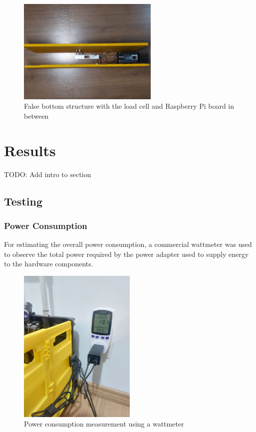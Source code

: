\documentclass[openright]{normas-utf-tex} %
\begin{document}
\begin{figure}[H]
	\centering
	\includegraphics[width=0.6\textwidth]{./images/cartbase2.jpeg}
	\caption[False bottom structure with the load cell and Raspberry Pi board in between]{False bottom structure with the load cell and Raspberry Pi board in between}
\end{figure}

\chapter{Results}

TODO: Add intro to section

\section{Testing}

\subsection{Power Consumption}

For estimating the overall power consumption, a commercial wattmeter was used
to observe the total power required by the power adapter used to supply energy
to the hardware components.

\begin{figure}[H]
	\centering
	\includegraphics[width=0.5\textwidth]{./images/powerconsumption.jpeg}
	\caption[Power consumption measurement using a wattmeter]{Power consumption measurement using a wattmeter}
\end{figure}
\end{document}
